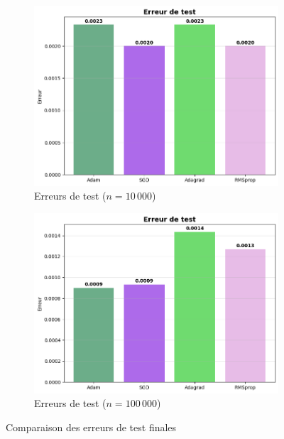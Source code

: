 \documentclass[a4paper,12pt]{article}
\begin{document}
\begin{figure}[H]
\centering
\begin{subfigure}[b]{0.48\textwidth}
    \includegraphics[width=\textwidth]{images/test_error_n10k.png}
    \caption[Erreurs de test (n=10k)]{Erreurs de test ($n=10\,000$)}
    \label{fig:test_10k}
\end{subfigure}
\hfill
\begin{subfigure}[b]{0.48\textwidth}
    \includegraphics[width=\textwidth]{images/test_error_n100k.png}
    \caption[Erreurs de test (n=100k)]{Erreurs de test ($n=100\,000$)}
    \label{fig:test_100k}
\end{subfigure}
\caption{Comparaison des erreurs de test finales}
\label{fig:test_results}
\end{figure}
\end{document}

